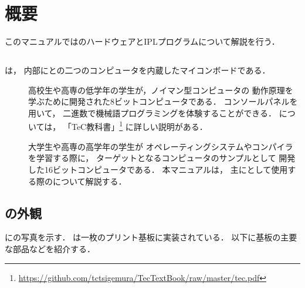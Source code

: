 \chapter{概要}
このマニュアルでは{\tecS}のハードウェアとIPLプログラムについて解説を行う．

\section{\tecS}
\tecS は，
内部に{\tec}と{\tac}の二つのコンピュータを内蔵したマイコンボードである．

\begin{description}
\item[\tec]
  高校生や高専の低学年の学生が，ノイマン型コンピュータの
  動作原理を学ぶために開発された8ビットコンピュータである．
  コンソールパネルを用いて，
  二進数で機械語プログラミングを体験することができる．
  {\tec}については，
  「TeC教科書」\footnote{
    \url{https://github.com/tctsigemura/TecTextBook/raw/master/tec.pdf}}
  に詳しい説明がある．
\item[\tac]
  大学生や高専の高学年の学生が
  オペレーティングシステムやコンパイラを学習する際に，
  ターゲットとなるコンピュータのサンプルとして
  開発した16ビットコンピュータである．
  本マニュアルは，
  主に{\tac}として使用する際の{\tecS}について解説する．
\end{description}

\section{{\tecS}の外観}

に{\tecS}の写真を示す．
{\tecS}は一枚のプリント基板に実装されている．
以下に基板の主要な部品などを紹介する．

